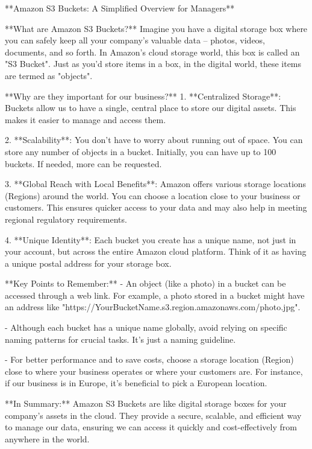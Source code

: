 **Amazon S3 Buckets: A Simplified Overview for Managers**

**What are Amazon S3 Buckets?**
Imagine you have a digital storage box where you can safely keep all your company's valuable data – photos, videos, documents, and so forth. In Amazon's cloud storage world, this box is called an "S3 Bucket". Just as you'd store items in a box, in the digital world, these items are termed as "objects".

**Why are they important for our business?**
1. **Centralized Storage**: Buckets allow us to have a single, central place to store our digital assets. This makes it easier to manage and access them.
   
2. **Scalability**: You don’t have to worry about running out of space. You can store any number of objects in a bucket. Initially, you can have up to 100 buckets. If needed, more can be requested.
   
3. **Global Reach with Local Benefits**: Amazon offers various storage locations (Regions) around the world. You can choose a location close to your business or customers. This ensures quicker access to your data and may also help in meeting regional regulatory requirements.

4. **Unique Identity**: Each bucket you create has a unique name, not just in your account, but across the entire Amazon cloud platform. Think of it as having a unique postal address for your storage box.

**Key Points to Remember:**
- An object (like a photo) in a bucket can be accessed through a web link. For example, a photo stored in a bucket might have an address like "https://YourBucketName.s3.region.amazonaws.com/photo.jpg".
  
- Although each bucket has a unique name globally, avoid relying on specific naming patterns for crucial tasks. It's just a naming guideline.
  
- For better performance and to save costs, choose a storage location (Region) close to where your business operates or where your customers are. For instance, if our business is in Europe, it's beneficial to pick a European location.

**In Summary:**
Amazon S3 Buckets are like digital storage boxes for your company's assets in the cloud. They provide a secure, scalable, and efficient way to manage our data, ensuring we can access it quickly and cost-effectively from anywhere in the world.